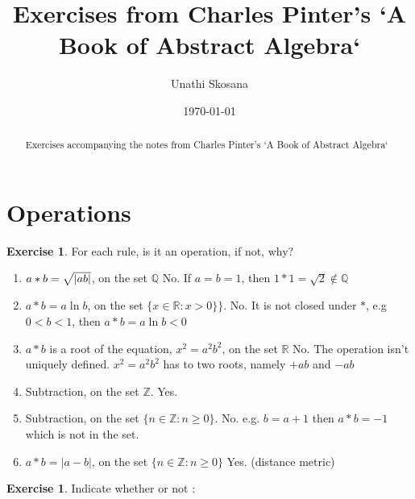 \documentclass[nohyper,nobib]{tufte-handout}
\title{Exercises from  Charles Pinter's `A Book of Abstract Algebra`} %
\author{Unathi Skosana}
\date{\vspace{-5pt}\normalsize \today} %
\theoremstyle{definition}
\newtheorem{exer}[thm]{Exercise}
\theoremstyle{remark}
\begin{document}
\justifying 
\maketitle

\begin{abstract}
\noindent
Exercises accompanying the notes from Charles Pinter's `A Book of Abstract Algebra`
\end{abstract}

\tableofcontents

\section{Operations}

\begin{exer}
    For each rule, is it an operation, if not, why?
\end{exer}

\begin{enumerate}
    \item $a * b  = \sqrt{\abs{a b}}$, on the set $\mathbb{Q}$ 
        \newline
        No. If $a = b = 1$, then $1 * 1 = \sqrt{2} \not\in \mathbb{Q}$
    \item $a * b  = a\ln{b}$, on the set $\{ x \in \mathbb{R}: x > 0\} \}$.
        \newline
        No. It is not closed under $*$, e.g $0 < b < 1$, then $a * b  = a\ln{b} < 0$
    \item $a * b$ is a root of the equation, $x^2 = a^2b^2$, on the set $\mathbb{R}$
        \newline
        No. The operation isn't uniquely defined. $x^2 = a^2b^2$ has to two roots, namely $+ab$ and $-ab$
    \item Subtraction, on the set $\mathbb{Z}$. 
        \newline
        Yes. 
    \item Subtraction, on the set $\{ n \in \mathbb{Z}: n \geq 0 \}$.
        \newline
        No. e.g. $b = a + 1$ then $a * b = -1$ which is not in the set.
    \item $a * b = |a - b|$, on the set $\{ n \in \mathbb{Z}: n \geq 0\}$
        \newline
        Yes. (distance metric)
\end{enumerate}

\noindent
\begin{exer}
    Indicate whether or not :
\end{exer}
\end{document}
